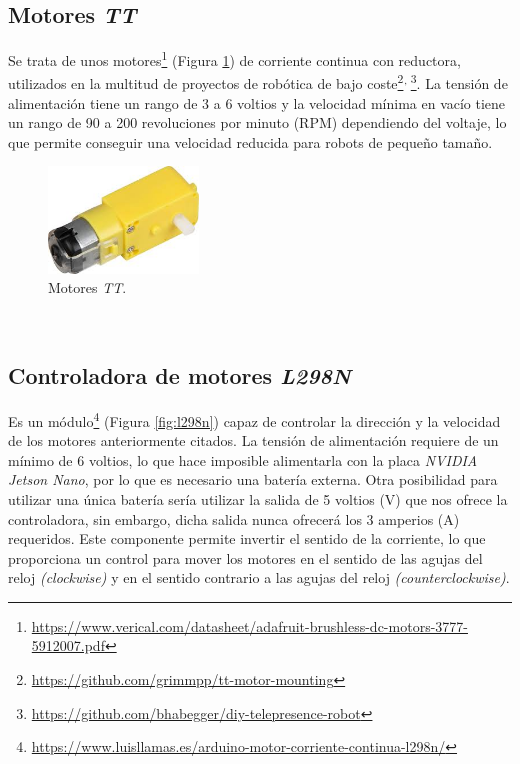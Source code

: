 \subsection{Motores \textit{TT}}
\label{subsection:motortt}
Se trata de unos motores\footnote{\url{https://www.verical.com/datasheet/adafruit-brushless-dc-motors-3777-5912007.pdf}} (Figura \ref{fig:motorTT}) de corriente continua con reductora, utilizados en la multitud de proyectos de robótica de bajo coste\footnote{\url{https://github.com/grimmpp/tt-motor-mounting}}$^{,\thinspace}$\footnote{\url{https://github.com/bhabegger/diy-telepresence-robot}}. La tensión de alimentación tiene un rango de 3 a 6 voltios y la velocidad mínima en vacío tiene un rango de 90 a 200 revoluciones por minuto (RPM) dependiendo del voltaje, lo que permite conseguir una velocidad reducida para robots de pequeño tamaño.\\

\begin{figure} [h!]
	\begin{center}
		\includegraphics[width=4cm]{figs/motorTT}
	\end{center}
	\caption{Motores \textit{TT}.}
	\label{fig:motorTT}
\end{figure}\

\subsection{Controladora de motores \textit{L298N}}
\label{subsection:l298n}
Es un módulo\footnote{\url{https://www.luisllamas.es/arduino-motor-corriente-continua-l298n/}} (Figura \ref{fig:l298n}) capaz de controlar la dirección y la velocidad de los motores anteriormente citados. La tensión de alimentación requiere de un mínimo de 6 voltios, lo que hace imposible alimentarla con la placa \textit{NVIDIA Jetson Nano}, por lo que es necesario una batería externa. Otra posibilidad para utilizar una única batería sería utilizar la salida de 5 voltios (V) que nos ofrece la controladora, sin embargo, dicha salida nunca ofrecerá los 3 amperios (A) requeridos. Este componente permite invertir el sentido de la corriente, lo que proporciona un control para mover los motores en el sentido de las agujas del reloj \textit{(clockwise)} y en el sentido contrario a las agujas del reloj \textit{(counterclockwise)}.\\

